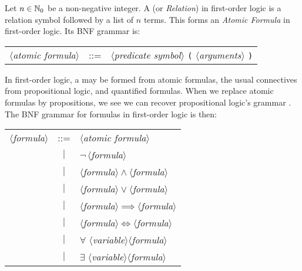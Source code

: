 \begin{node}[Syntax]
\begin{definition}\label{fol-0003}%
Let $n\in\mathbb{N}_{0}$ be a non-negative integer. A  (or
\emph{Relation}) in first-order logic is a relation symbol followed by a
list of $n$ terms. This forms an \textit{Atomic Formula} in first-order logic.
Its BNF grammar is:
\begin{center}
\begin{tabular}{rcl}
$\langle$\textit{atomic formula}$\rangle$ & ::= & $\langle$\textit{predicate symbol}$\rangle$ \verb#(# $\langle$\textit{arguments}$\rangle$ \verb#)#\\
\end{tabular}
\end{center}
\end{definition}

\begin{definition}\label{fol-0004}%
In first-order logic, a  may be formed from atomic
formulas, the usual connectives from propositional logic, and quantified
formulas. When we replace atomic formulas by propositions, we see we can
recover propositional logic's grammar . The BNF grammar
for formulas in first-order logic is then: 
\begin{center}
\begin{tabular}{rcl}
$\langle$\textit{formula}$\rangle$ & ::= & $\langle$\textit{atomic formula}$\rangle$\\
& $|$ & $\neg\,\langle$\textit{formula}$\rangle$\\
& $|$ & $\langle$\textit{formula}$\rangle\land\langle$\textit{formula}$\rangle$\\
& $|$ & $\langle$\textit{formula}$\rangle\lor\langle$\textit{formula}$\rangle$\\
& $|$ & $\langle$\textit{formula}$\rangle\implies\langle$\textit{formula}$\rangle$\\
& $|$ & $\langle$\textit{formula}$\rangle\iff\langle$\textit{formula}$\rangle$\\
& $|$ & $\forall$ $\langle$\textit{variable}$\rangle\langle$\textit{formula}$\rangle$\\
& $|$ & $\exists$ $\langle$\textit{variable}$\rangle\langle$\textit{formula}$\rangle$\\
\end{tabular}
\end{center}
\end{definition}
\end{node}

